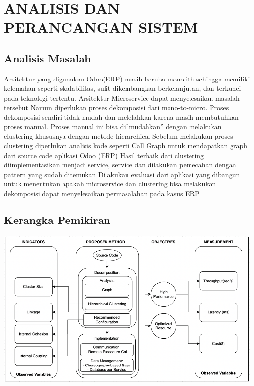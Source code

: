 \chapter{ANALISIS DAN PERANCANGAN SISTEM}
\vspace{4.5pt}

\section{Analisis Masalah}
Arsitektur yang digunakan Odoo(ERP) masih beruba monolith sehingga memiliki kelemahan seperti skalabilitas, sulit dikembangkan berkelanjutan, dan terkunci pada teknologi tertentu.
Arsitektur Microservice dapat menyelesaikan masalah tersebut
Namun diperlukan proses dekomposisi dari mono-to-micro. Proses dekomposisi sendiri  tidak mudah dan melelahkan karena masih membutuhkan proses manual. 
Proses manual ini bisa di”mudahkan” dengan melakukan clustering khususnya dengan metode hierarchical 
Sebelum melakukan proses clustering diperlukan analisis kode seperti Call Graph untuk mendapatkan graph dari source code aplikasi Odoo (ERP)
Hasil terbaik dari clustering diimplementasikan menjadi service, service dan dilakukan pemecahan dengan pattern yang sudah ditemukan
Dilakukan evaluasi dari aplikasi yang dibangun untuk menentukan apakah microservice dan clustering bisa melakukan dekomposisi dapat menyelesaikan permasalahan pada kasus ERP

\section{Kerangka Pemikiran}
\begin{center}
	\includegraphics[width=14cm]{img/KerangkaPemikiran.png}
	\label{fig:asd}
\end{center}


